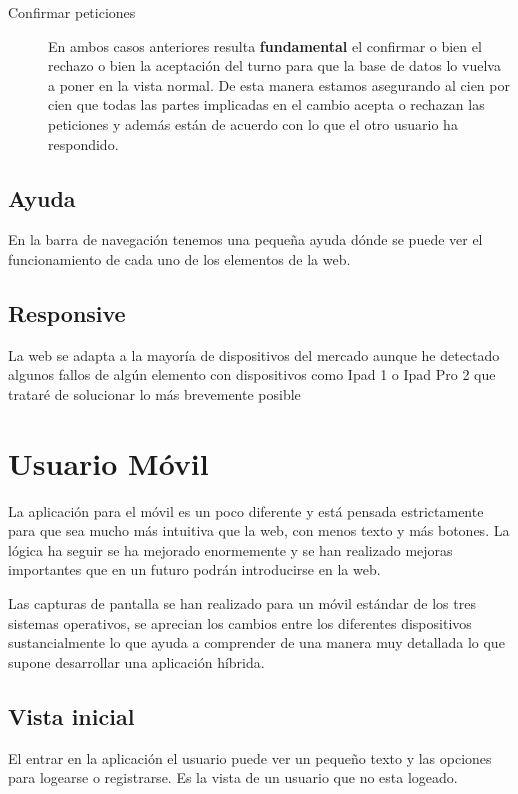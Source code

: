 \begin{description}
\begin{itemize}
\end{itemize}


\item[Confirmar peticiones]
En ambos casos anteriores resulta \textbf{fundamental} el confirmar o bien el rechazo o bien la aceptación del turno para que la base de datos lo vuelva a poner en la vista normal. De esta manera estamos asegurando al cien por cien que todas las partes implicadas en el cambio acepta o rechazan las peticiones y además están de acuerdo con lo que el otro usuario ha respondido.

\end{description}

\subsection{Ayuda}
En la barra de navegación tenemos una pequeña ayuda dónde se puede ver el funcionamiento de cada uno de los elementos de la web. 

\subsection{Responsive}
La web se adapta a la mayoría de dispositivos del mercado aunque he detectado algunos fallos de algún elemento con dispositivos como Ipad 1 o Ipad Pro 2 que trataré de solucionar lo más brevemente posible



\section{Usuario Móvil}
La aplicación para el móvil es un poco diferente y está pensada estrictamente para que sea mucho más intuitiva que la web, con menos texto y más botones. La lógica ha seguir se ha mejorado enormemente y se han realizado mejoras importantes que en un futuro podrán introducirse en la web. 

Las capturas de pantalla se han realizado para un móvil estándar de los tres sistemas operativos, se aprecian los cambios entre los diferentes dispositivos sustancialmente lo que ayuda a comprender de una manera muy detallada lo que supone desarrollar una aplicación híbrida.



\subsection{Vista inicial}
El entrar en la aplicación el usuario puede ver un pequeño texto y las opciones para logearse o registrarse. Es la vista de un usuario que no esta logeado.


